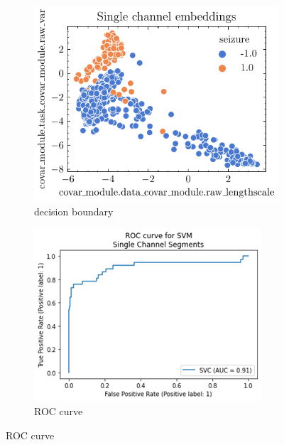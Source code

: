 \begin{figure}[htb]
    \centering
    \begin{subfigure}[b]{0.5\floatwidth}
        \includegraphics[width=\textwidth]{5Results/figs/svm/svm.pdf}
        \caption{decision boundary}
    \end{subfigure}
    \hfill    
    \begin{subfigure}[b]{0.5\floatwidth}
        \includegraphics[width=\textwidth]{5Results/figs/svm/svm_roc.png}
        \caption{ROC curve}
    \end{subfigure}
    \hfill
    \label{fig:5results:svm}
\end{figure}

